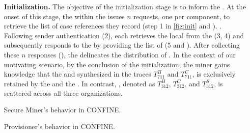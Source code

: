 \noindent\textbf{Initialization.} The objective of the initialization stage is to inform the . At the onset of this stage, the  within the  issues $n$ requests, one per  component, %
to retrieve the list of case references they record (step 1 in \cref{fig:init} and ). . Following sender authentication (2), each  retrieves the local  from the  (3, 4) and subsequently responds to the  by providing the list of  (5 and ). After collecting these $n$ responses (), the  delineates the distribution of . In the context of our motivating scenario, by the conclusion of the initialization, the miner gains knowledge that the  and synthesized in the traces $T^H_{711}$ and $T^C_{711}$, is exclusively retained by the  and the . In contrast, , denoted as $T^H_{312}$, $T^C_{312}$, and $T^S_{312}$, is scattered across all three organizations.
\begin{algorithm2e}[tb]
	
	\caption{Secure Miner's behavior in CONFINE.}
	\label{alg:secm}
\end{algorithm2e} 
\begin{algorithm2e}[tb]
	
	\caption{Provisioner's behavior in CONFINE.}
	\label{alg:lprv}
\end{algorithm2e} 
%


